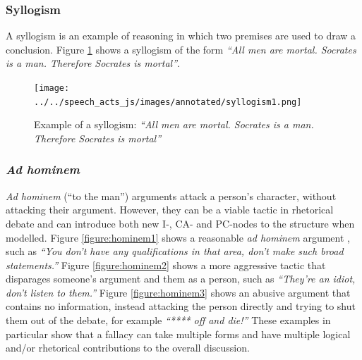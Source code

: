 \subsubsection{Syllogism}
A syllogism is an example of reasoning in which two premises are used to draw a conclusion. Figure \ref{figure:syllogism1} shows a syllogism of the form \textit{``All men are mortal. Socrates is a man. Therefore Socrates is mortal''}.

\begin{figure}[H]
\centering
\texttt{[image: ../../speech\_acts\_js/images/annotated/syllogism1.png]}
\caption{Example of a syllogism: \textit{``All men are mortal. Socrates is a man. Therefore Socrates is mortal''}}
\label{figure:syllogism1}
\end{figure}


\subsubsection{\textit{Ad hominem}}
\textit{Ad hominem} (``to the man'') arguments attack a person's character, without attacking their argument. However, they can be a viable tactic in rhetorical debate and can introduce both new I-, CA- and PC-nodes to the structure when modelled. Figure \ref{figure:hominem1} shows a reasonable \textit{ad hominem} argument \cite{walton1987}, such as \textit{``You don't have any qualifications in that area, don't make such broad statements.''} Figure \ref{figure:hominem2} shows a more aggressive tactic that disparages someone's argument and them as a person, such as \textit{``They're an idiot, don't listen to them.''} Figure \ref{figure:hominem3} shows an abusive argument that contains no information, instead attacking the person directly and trying to shut them out of the debate, for example \textit{``**** off and die!''} These examples in particular show that a fallacy can take multiple forms and have multiple logical and/or rhetorical contributions to the overall discussion.




